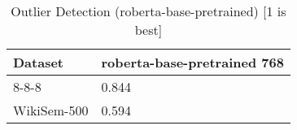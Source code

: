\begin{table}[]
\centering
\begin{tabular}{l|l}
\hline
Dataset & roberta-base-pretrained 768 \\
\hline
8-8-8 & 0.844 \\ 
WikiSem-500 & 0.594
\end{tabular}
\caption{Outlier Detection (roberta-base-pretrained) [1 is best]}
\label{tab:outlier-roberta-base-pretrained}
\end{table}
